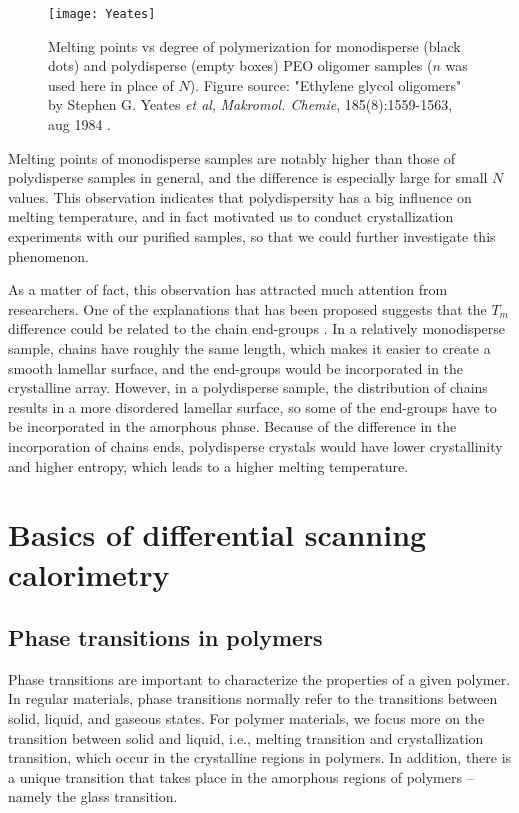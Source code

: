 \begin{figure}[H]
\center
\texttt{[image: Yeates]}
\caption[Melting points vs degree of polymerization for monodisperse (black dots) and polydisperse (empty boxes) PEO oligomer samples.]{Melting points vs degree of polymerization for monodisperse (black dots) and polydisperse (empty boxes) PEO oligomer samples ($n$ was used here in place of $N$). Figure source: "Ethylene glycol oligomers" by Stephen G. Yeates \textit{et al}, \textit{Makromol. Chemie}, 185(8):1559-1563, aug 1984 \cite{Yeates1984}.}
\label{fig:Yeates}
\end{figure}

Melting points of monodisperse samples are notably higher than those of polydisperse samples in general, and the difference is especially large for small $N$ values. This observation indicates that polydispersity has a big influence on melting temperature, and in fact motivated us to conduct crystallization experiments with our purified samples, so that we could further investigate this phenomenon.

As a matter of fact, this observation has attracted much attention from researchers. One of the explanations that has been proposed suggests that the $T_{m}$ difference could be related to the chain end-groups \cite{Percec1989}. In a relatively monodisperse sample, chains have roughly the same length, which makes it easier to create a smooth lamellar surface, and the end-groups would be incorporated in the crystalline array. However, in a polydisperse sample, the distribution of chains results in a more disordered lamellar surface, so some of the end-groups have to be incorporated in the amorphous phase. Because of the difference in the incorporation of chains ends, polydisperse crystals would have lower crystallinity and higher entropy, which leads to a higher melting temperature.

\section{Basics of differential scanning calorimetry}

\subsection{Phase transitions in polymers}

Phase transitions are important to characterize the properties of a given polymer. In regular materials, phase transitions normally refer to the transitions between solid, liquid, and gaseous states. For polymer materials, we focus more on the transition between solid and liquid, i.e., melting transition and crystallization transition, which occur in the crystalline regions in polymers. In addition, there is a unique transition that takes place in the amorphous regions of polymers -- namely the glass transition.

